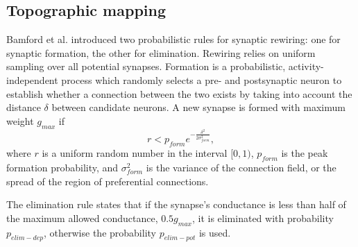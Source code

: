 \documentclass[preprint,12pt]{elsarticle}
\begin{document}
\subsection{Topographic mapping}

Bamford et al. \cite{bamford2010synaptic} introduced two probabilistic rules for synaptic rewiring: one for synaptic formation, the other for elimination.
Rewiring relies on uniform sampling over all potential synapses. 
Formation is a probabilistic, activity-independent
process which randomly selects a pre- and postsynaptic neuron to establish whether a connection between the two exists by taking into account the distance $\delta$ between candidate neurons. 
A new synapse is formed with maximum weight $g_{max}$ if
%
\begin{equation} \label{eq:formation_rule}
r<p_{form}e^{-\frac{\delta^2}{2\sigma^2_{form}}},
\end{equation}
%
where $r$ is a uniform random number in the interval $[0, 1)$, $p_{form}$ is the peak formation probability, and $\sigma^2_{form}$ is the variance of the connection field, or the spread of the region of preferential connections.

The elimination rule states that if the synapse's conductance is less than half of the maximum allowed conductance, $0.5g_{max}$, it is eliminated with probability $p_{elim-dep}$, otherwise the probability $p_{elim-pot}$ is used.
\end{document}
